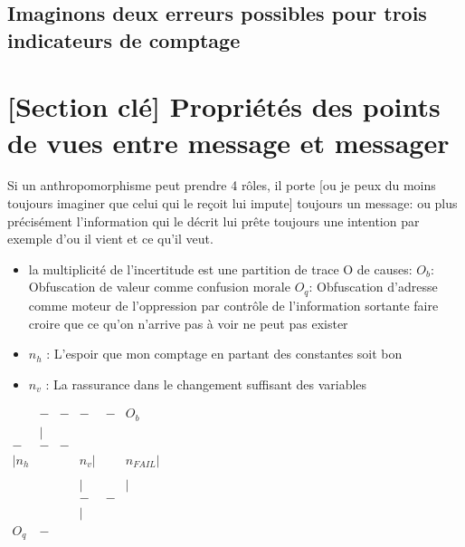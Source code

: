 \documentclass{article}
\begin{document}
\subsection{ Imaginons deux  erreurs possibles pour trois indicateurs de comptage}
  
  \section{[Section clé] Propriétés des points de vues entre message et messager}
Si un anthropomorphisme peut prendre 4 rôles, il porte [ou  je peux du moins toujours imaginer que celui qui le reçoit lui impute] toujours un message: ou plus précisément l'information qui le décrit lui prête toujours une intention  par exemple d'ou il vient et ce qu'il veut.


\begin{itemize}
\item la multiplicité de l'incertitude  est une partition de trace  O de causes: 
\subitem $O_b$:  Obfuscation de valeur  comme confusion  morale
\subitem $O_q$:  Obfuscation d'adresse comme moteur de l'oppression par contrôle de l'information sortante faire croire que ce qu'on n'arrive pas à voir ne peut pas exister
\item $n_h$ : L'espoir que mon comptage en partant des constantes soit bon 
\item $n_v$ : La rassurance dans le changement suffisant des variables
\end{itemize}


${\scriptscriptstyle\begin{matrix}
  & - & - & - & - &O_b   \\
  & | &   &   &   &   \\
- & - & - &   &   &   \\
| n_h&  &   & n_v| &   & n_{FAIL}| \\
  &   &   &   &   &   \\
&   &  &|   & & | \\
  &   &  & - & - &   \\
  &   &  &   |&   &   \\
  O_q& - &   &   &   &   \\
  &   &   &   &   &   \\
  &   &   &   &   &   \\
\end{matrix}}$
\end{document}
